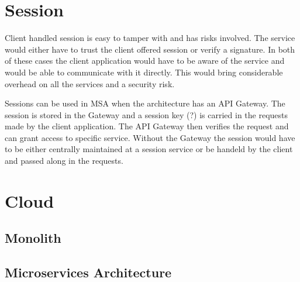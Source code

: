\section{Session}
\begin{sloppypar}
    Client handled session is easy to tamper with and has risks involved. The 
    service would either have to trust the client offered session or verify a 
    signature. In both of these cases the client application would have to be 
    aware of the service and would be able to communicate with it directly. 
    This would bring considerable overhead on all the services and a security 
    risk.
\end{sloppypar}
\begin{sloppypar}
    Sessions can be used in MSA when the architecture has an API Gateway. The 
    session is stored in the Gateway and a session key (?) is carried in the 
    requests made by the client application. The API Gateway then verifies the
    request and can grant access to specific service. Without the Gateway the
    session would have to be either centrally maintained at a session service 
    or be handeld by the client and passed along in the requests.
\end{sloppypar}




\section{Cloud}
\subsection{Monolith}
\subsection{Microservices Architecture}




